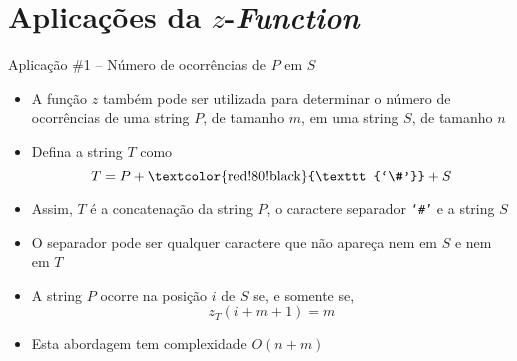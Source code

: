 \section{Aplicações da $z$-{\it Function}}

\begin{frame}[fragile]{Aplicação \#1 -- Número de ocorrências de $P$ em $S$}

    \begin{itemize}
        \item A função $z$ também pode ser utilizada para determinar o número de ocorrências de 
            uma string $P$, de tamanho $m$, em uma string $S$, de tamanho $n$

        \item Defina a string $T$ como
        \[
            T = P + \mbox{\textcolor{red!80!black}{\texttt{`\#'}}} + S
        \]

        \item Assim, $T$ é a concatenação da string $P$, o caractere separador
        \textcolor{red!80!black}{\texttt{`\#'}} e a string $S$

        \item O separador pode ser qualquer caractere que não apareça nem em $S$ e nem em $T$ 

        \item A string $P$ ocorre na posição $i$ de $S$ se, e somente se, 
        \[
            z_T(i + m + 1) = m
        \]

        \item Esta abordagem tem complexidade $O(n + m)$

    \end{itemize}

\end{frame}

